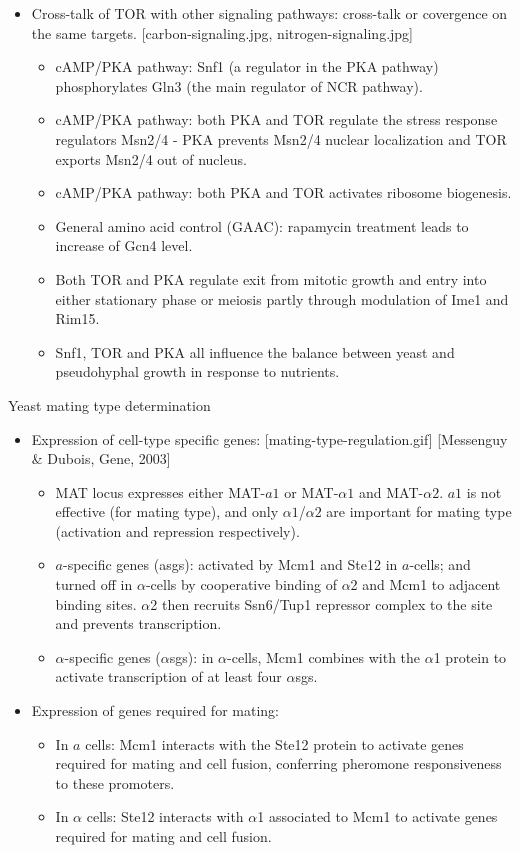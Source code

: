 \documentclass{report}
\begin{document}
\begin{itemize}
\item Cross-talk of TOR with other signaling pathways: cross-talk or covergence on the same targets. [carbon-signaling.jpg, nitrogen-signaling.jpg]
\begin{itemize}
	\item cAMP/PKA pathway: Snf1 (a regulator in the PKA pathway) phosphorylates Gln3 (the main regulator of NCR pathway). 
	\item cAMP/PKA pathway: both PKA and TOR regulate the stress response regulators Msn2/4 - PKA prevents Msn2/4 nuclear localization and TOR exports Msn2/4 out of nucleus. 
	\item cAMP/PKA pathway: both PKA and TOR activates ribosome biogenesis. 
	\item General amino acid control (GAAC): rapamycin treatment leads to increase of Gcn4 level. 
	\item Both TOR and PKA regulate exit from mitotic growth and entry into either stationary phase or meiosis partly through modulation of Ime1 and Rim15.
	\item Snf1, TOR and PKA all influence the balance between yeast and pseudohyphal growth in response to nutrients. 
\end{itemize}
\end{itemize}

Yeast mating type determination
\begin{itemize}
\item Expression of cell-type specific genes: [mating-type-regulation.gif] [Messenguy \& Dubois, Gene, 2003]
\begin{itemize}
	\item MAT locus expresses either MAT-$a1$ or MAT-$\alpha1$ and MAT-$\alpha2$. $a1$ is not effective (for mating type), and only $\alpha1$/$\alpha2$ are important for mating type (activation and repression respectively). 
	\item $a$-specific genes (asgs): activated by Mcm1 and Ste12 in $a$-cells; and turned off in $\alpha$-cells by cooperative binding of $\alpha$2 and Mcm1 to adjacent binding sites. $\alpha$2 then recruits Ssn6/Tup1 repressor complex to the site and prevents transcription. 
	\item $\alpha$-specific genes ($\alpha$sgs): in $\alpha$-cells, Mcm1 combines with the $\alpha$1 protein to activate transcription of at least four $\alpha$sgs. 
\end{itemize}

\item Expression of genes required for mating: 
\begin{itemize}
	\item In $a$ cells: Mcm1 interacts with the Ste12 protein to activate genes required for mating and cell fusion, conferring pheromone responsiveness to these promoters. 
	\item In $\alpha$ cells: Ste12 interacts with $\alpha$1 associated to Mcm1 to activate genes required for mating and cell fusion. 
\end{itemize}
\end{itemize}
\end{document}
